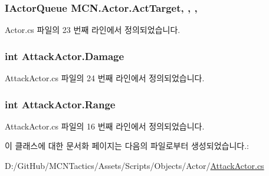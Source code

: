 \subsubsection[{\texorpdfstring{Act\+Target}{ActTarget}}]{\setlength{\rightskip}{0pt plus 5cm}I\+Actor\+Queue M\+C\+N.\+Actor.\+Act\+Target\hspace{0.3cm}{\ttfamily [get]}, {}, {\ttfamily [protected]}, {\ttfamily [inherited]}}\hypertarget{class_m_c_n_1_1_actor_a1d809d2994dcccb6a8fcc665afa1ca6f}{}\label{class_m_c_n_1_1_actor_a1d809d2994dcccb6a8fcc665afa1ca6f}


Actor.\+cs 파일의 23 번째 라인에서 정의되었습니다.

\subsubsection[{\texorpdfstring{Damage}{Damage}}]{\setlength{\rightskip}{0pt plus 5cm}int Attack\+Actor.\+Damage\hspace{0.3cm}{\ttfamily [get]}}\hypertarget{class_attack_actor_aaa126531b12eeb6d03311d761697cc84}{}\label{class_attack_actor_aaa126531b12eeb6d03311d761697cc84}


Attack\+Actor.\+cs 파일의 24 번째 라인에서 정의되었습니다.

\subsubsection[{\texorpdfstring{Range}{Range}}]{\setlength{\rightskip}{0pt plus 5cm}int Attack\+Actor.\+Range\hspace{0.3cm}{\ttfamily [get]}}\hypertarget{class_attack_actor_aa331a3d1fbebd46a2458c64b209af927}{}\label{class_attack_actor_aa331a3d1fbebd46a2458c64b209af927}


Attack\+Actor.\+cs 파일의 16 번째 라인에서 정의되었습니다.



이 클래스에 대한 문서화 페이지는 다음의 파일로부터 생성되었습니다.\+:\begin{DoxyCompactItemize}
\item 
D\+:/\+Git\+Hub/\+M\+C\+N\+Tactics/\+Assets/\+Scripts/\+Objects/\+Actor/\hyperlink{_attack_actor_8cs}{Attack\+Actor.\+cs}\end{DoxyCompactItemize}
